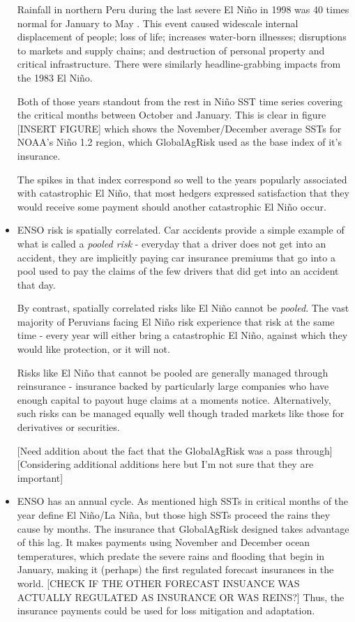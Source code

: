 \documentclass[authoryear]{article}
\begin{document}
\begin{itemize}
Rainfall in northern Peru during the last severe El Ni\~no in 1998 was 40 times normal for January to May \citep{skees2009enso}. This event caused widescale internal displacement of people; loss of life; increases water-born illnesses; disruptions to markets and supply chains; and destruction of personal property and critical infrastructure. There were similarly headline-grabbing impacts from the 1983 El Ni\~no.

Both of those years standout from the rest in Ni\~no SST time series covering the critical months between October and January. This is clear in figure [INSERT FIGURE] which shows the November/December average SSTs for NOAA's Ni\~no 1.2 region, which GlobalAgRisk used as the base index of it's insurance.

The spikes in that index correspond so well to the years popularly associated with catastrophic El Ni\~no, that most hedgers expressed satisfaction that they would receive some payment should another catastrophic El Ni\~no occur.

\item ENSO risk is spatially correlated.
Car accidents provide a simple example of what is called a \emph{pooled risk} - everyday that a driver does not get into an accident, they are implicitly paying car insurance premiums that go into a pool used to pay the claims of the few drivers that did get into an accident that day. 

By contrast, spatially correlated risks like El Ni\~no cannot be \emph{pooled}. The vast majority of Peruvians facing El Ni\~no risk experience that risk at the same time - every year will either bring a catastrophic El Ni\~no, against which they would like protection, or it will not. 

Risks like El Ni\~no that cannot be pooled are generally managed through reinsurance -  insurance backed by particularly large companies who have enough capital to payout huge claims at a moments notice. Alternatively, such risks can be managed equally well though traded markets like those for derivatives or securities. 

[Need addition about the fact that the GlobalAgRisk was a pass through]
[Considering additional additions here but I'm not sure that they are important]

\item ENSO has an annual cycle.
As mentioned high SSTs in critical months of the year define El Ni\~no/La Ni\~na, but those high SSTs proceed the rains they cause by months. The insurance that GlobalAgRisk designed takes advantage of this lag. It makes payments using November and December ocean temperatures, which predate the severe rains and flooding that begin in January, making it (perhaps) the first regulated forecast insurances in the world. [CHECK IF THE OTHER FORECAST INSUANCE WAS ACTUALLY REGULATED AS INSURANCE OR WAS REINS?] Thus, the insurance payments could be used for loss mitigation and adaptation.


\end{itemize}
\end{document}
